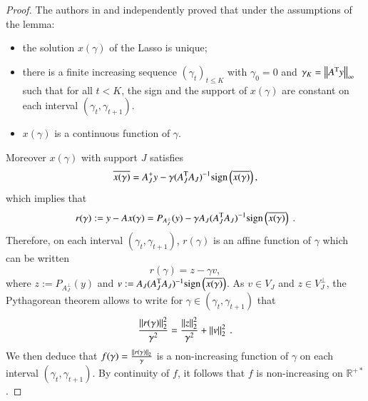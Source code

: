 \begin{proof} 
The authors in \cite{osborne-homotopy} and \cite{dossal-topological} independently proved that under the assumptions of the lemma:
\begin{itemize}
\item the solution $x(\gamma)$ of the Lasso is unique;
\item there is a finite increasing sequence $(\gamma_t)_{t \leq K}$ with $\gamma_0=0$ and $\gamma_K=\left\Vert{A^\mathrm{T}y}\right\Vert_{\infty}$ such that for all $t<K$, the sign and the support of $x(\gamma)$ are constant on each interval $(\gamma_{t},\gamma_{t+1})$.
\item $x(\gamma)$ is a continuous function of $\gamma$.
\end{itemize}
Moreover $x(\gamma)$ with support $J$ satisfies 
\begin{equation}\label{eqdefxgamma}
\overline{x(\gamma)}=A_J^+y-\gamma(A_J^\mathrm{T}A_J)^{-1}\mathrm{sign}\left(\overline{x(\gamma)}\right),
\end{equation} 
which implies that
\begin{equation*}
r(\gamma):=y-Ax(\gamma)=P_{A_J^{\perp}}(y)-\gamma A_J(A_J^\mathrm{T}A_J)^{-1}\mathrm{sign}\left(\overline{x(\gamma)}\right) ~.
\end{equation*}
Therefore, on each interval $(\gamma_{t},\gamma_{t+1})$, $r(\gamma)$ is an affine function of $\gamma$ which can be written 
\begin{equation*}
r(\gamma)=z-\gamma v,
\end{equation*}
where $z:=P_{A_J^{\perp}}(y)$ and $v:=A_J(A_J^\mathrm{T}A_J)^{-1}\mathrm{sign}\left(\overline{x(\gamma)}\right)$. As $v \in V_J$ and $z\in V_J^{\perp}$, the Pythagorean theorem allows to write for $\gamma\in(\gamma_t,\gamma_{t+1})$ that
\begin{equation}
\frac{\left\Vert{r(\gamma)}\right\Vert_{2}^2}{\gamma^2}=\frac{\left\Vert{z}\right\Vert_{2}^2}{\gamma^2}+\left\Vert{v}\right\Vert_{2}^2 ~.
\end{equation}
We then deduce that $f(\gamma)=\frac{\left\Vert{r(\gamma)}\right\Vert_{2}}{\gamma}$ is a non-increasing function of $\gamma$ on each interval $(\gamma_t,\gamma_{t+1})$. By continuity of $f$, it follows that $f$ is non-increasing on $\mathbb{R}^{+*}$.

\end{proof}

